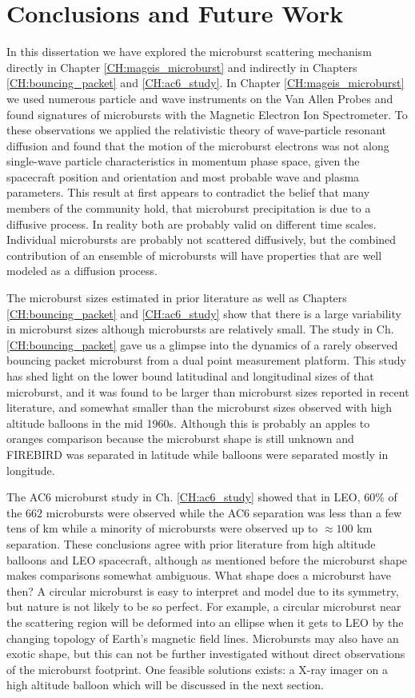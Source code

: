 \chapter{Conclusions and Future Work}\label{conclusions}
In this dissertation we have explored the microburst scattering mechanism directly in Chapter \ref{CH:mageis_microburst} and indirectly in Chapters \ref{CH:bouncing_packet} and \ref{CH:ac6_study}. In Chapter \ref{CH:mageis_microburst} we used numerous particle and wave instruments on the Van Allen Probes and found signatures of microbursts with the Magnetic Electron Ion Spectrometer. To these observations we applied the relativistic theory of wave-particle resonant diffusion and found that the motion of the microburst electrons was not along single-wave particle characteristics in momentum phase space, given the spacecraft position and orientation and most probable wave and plasma parameters. This result at first appears to contradict the belief that many members of the community hold, that microburst precipitation is due to a diffusive process. In reality both are probably valid on different time scales. Individual microbursts are probably not scattered diffusively, but the combined contribution of an ensemble of microbursts will have properties that are well modeled as a diffusion process.

The microburst sizes estimated in prior literature as well as Chapters \ref{CH:bouncing_packet} and \ref{CH:ac6_study} show that there is a large variability in microburst sizes although microbursts are relatively small. The study in Ch. \ref{CH:bouncing_packet} gave us a glimpse into the dynamics of a rarely observed bouncing packet microburst from a dual point measurement platform. This study has shed light on the lower bound latitudinal and longitudinal sizes of that microburst, and it was found to be larger than microburst sizes reported in recent literature, and somewhat smaller than the microburst sizes observed with high altitude balloons in the mid 1960s. Although this is probably an apples to oranges comparison because the microburst shape is still unknown and FIREBIRD was separated in latitude while balloons were separated mostly in longitude.

The AC6 microburst study in Ch. \ref{CH:ac6_study} showed that in LEO, $60 \%$ of the $662$ microbursts were observed while the AC6 separation was less than a few tens of km while a minority of microbursts were observed up to $\approx 100$ km separation. These conclusions agree with prior literature from high altitude balloons and LEO spacecraft, although as mentioned before the microburst shape makes comparisons somewhat ambiguous. What shape does a microburst have then? A circular microburst is easy to interpret and model due to its symmetry, but nature is not likely to be so perfect. For example, a circular microburst near the scattering region will be deformed into an ellipse when it gets to LEO by the changing topology of Earth's magnetic field lines. Microbursts may also have an exotic shape, but this can not be further investigated without direct observations of the microburst footprint. One feasible solutions exists: a X-ray imager on a high altitude balloon which will be discussed in the next section.

